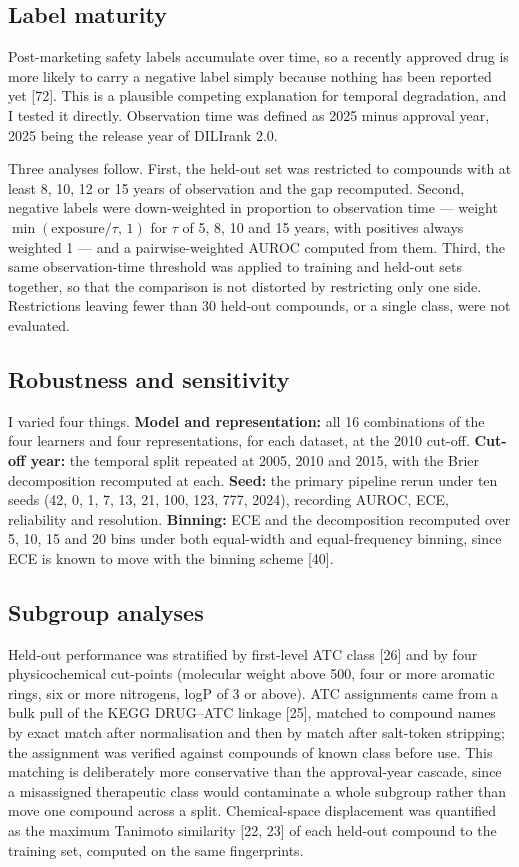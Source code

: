 \subsection{Label maturity}

Post-marketing safety labels accumulate over time, so a recently approved drug is more likely to carry a negative label simply because nothing has been reported yet [72]. This is a plausible competing explanation for temporal degradation, and I tested it directly. Observation time was defined as 2025 minus approval year, 2025 being the release year of DILIrank 2.0.

Three analyses follow. First, the held-out set was restricted to compounds with at least 8, 10, 12 or 15 years of observation and the gap recomputed. Second, negative labels were down-weighted in proportion to observation time --- weight $\min(\mathrm{exposure}/\tau,\,1)$ for $\tau$ of 5, 8, 10 and 15 years, with positives always weighted 1 --- and a pairwise-weighted AUROC computed from them. Third, the same observation-time threshold was applied to training and held-out sets together, so that the comparison is not distorted by restricting only one side. Restrictions leaving fewer than 30 held-out compounds, or a single class, were not evaluated.

\subsection{Robustness and sensitivity}

I varied four things. \textbf{Model and representation:} all 16 combinations of the four learners and four representations, for each dataset, at the 2010 cut-off. \textbf{Cut-off year:} the temporal split repeated at 2005, 2010 and 2015, with the Brier decomposition recomputed at each. \textbf{Seed:} the primary pipeline rerun under ten seeds (42, 0, 1, 7, 13, 21, 100, 123, 777, 2024), recording AUROC, ECE, reliability and resolution. \textbf{Binning:} ECE and the decomposition recomputed over 5, 10, 15 and 20 bins under both equal-width and equal-frequency binning, since ECE is known to move with the binning scheme [40].

\subsection{Subgroup analyses}

Held-out performance was stratified by first-level ATC class [26] and by four physicochemical cut-points (molecular weight above 500, four or more aromatic rings, six or more nitrogens, logP of 3 or above). ATC assignments came from a bulk pull of the KEGG DRUG--ATC linkage [25], matched to compound names by exact match after normalisation and then by match after salt-token stripping; the assignment was verified against compounds of known class before use. This matching is deliberately more conservative than the approval-year cascade, since a misassigned therapeutic class would contaminate a whole subgroup rather than move one compound across a split. Chemical-space displacement was quantified as the maximum Tanimoto similarity [22, 23] of each held-out compound to the training set, computed on the same fingerprints.

